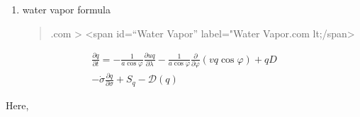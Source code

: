 \begin{enumerate}
\def\labelenumi{\arabic{enumi}.}
\setcounter{enumi}{4}
\item
  water vapor formula

  \begin{quote}
  \blazer\blazer.com \textgreater{} \textless span id=``Water Vapor''
  label="Water Vapor\cleaner\cleaner.com lt;/span\textgreater{}
  \end{quote}
\end{enumerate}

\begin{eqnarray}
  \frac{\partial q}{\partial t}
   =  - \frac{1}{a\cos\varphi}
               \frac{\partial uq}{\partial \lambda}
          - \frac{1}{a\cos\varphi}
               \frac{\partial }{\partial \varphi} (vq \cos\varphi)
          + q D  \\
        - \dot{\sigma} \frac{\partial q }{\partial \sigma}
          + S_{q}
          - {\mathcal D}(q)
\end{eqnarray}

Here,

